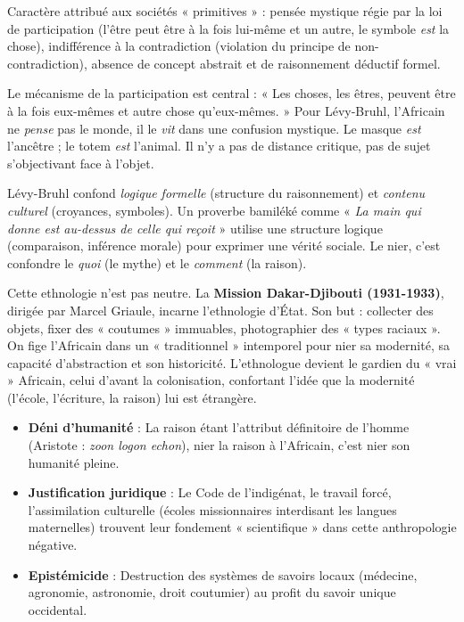 \documentclass[11pt]{article}
\newcommand{\cle}[1]{{\popxbold\color{popdark}#1}}
\begin{document}
\begin{definition}
Caractère attribué aux sociétés « primitives » : pensée mystique régie par la \cle{loi de participation} (l'être peut être à la fois lui-même et un autre, le symbole \emph{est} la chose), indifférence à la contradiction (violation du principe de non-contradiction), absence de concept abstrait et de raisonnement déductif formel.
\end{definition}

\noindent Le mécanisme de la \cle{participation} est central : « Les choses, les êtres, peuvent être à la fois eux-mêmes et autre chose qu'eux-mêmes. » Pour Lévy-Bruhl, l'Africain ne \emph{pense} pas le monde, il le \emph{vit} dans une confusion mystique. Le masque \emph{est} l'ancêtre ; le totem \emph{est} l'animal. Il n'y a pas de distance critique, pas de sujet s'objectivant face à l'objet.

\begin{attention}
Lévy-Bruhl confond \emph{logique formelle} (structure du raisonnement) et \emph{contenu culturel} (croyances, symboles). Un proverbe bamiléké comme « \emph{La main qui donne est au-dessus de celle qui reçoit} » utilise une structure logique (comparaison, inférence morale) pour exprimer une vérité sociale. Le nier, c'est confondre le \emph{quoi} (le mythe) et le \emph{comment} (la raison).
\end{attention}

\noindent Cette ethnologie n'est pas neutre. La \textbf{Mission Dakar-Djibouti (1931-1933)}, dirigée par Marcel Griaule, incarne l'ethnologie d'État. Son but : collecter des objets, fixer des « coutumes » immuables, photographier des « types raciaux ». On fige l'Africain dans un « traditionnel » intemporel pour nier sa modernité, sa capacité d'abstraction et son historicité. L'ethnologue devient le gardien du « vrai » Africain, celui d'avant la colonisation, confortant l'idée que la modernité (l'école, l'écriture, la raison) lui est étrangère.

\begin{aretenir}
\begin{itemize}
    \item \textbf{Déni d'humanité} : La raison étant l'attribut définitoire de l'homme (Aristote : \emph{zoon logon echon}), nier la raison à l'Africain, c'est nier son humanité pleine.
    \item \textbf{Justification juridique} : Le Code de l'indigénat, le travail forcé, l'assimilation culturelle (écoles missionnaires interdisant les langues maternelles) trouvent leur fondement « scientifique » dans cette anthropologie négative.
    \item \textbf{Epistémicide} : Destruction des systèmes de savoirs locaux (médecine, agronomie, astronomie, droit coutumier) au profit du savoir unique occidental.
\end{itemize}
\end{aretenir}
\end{document}
